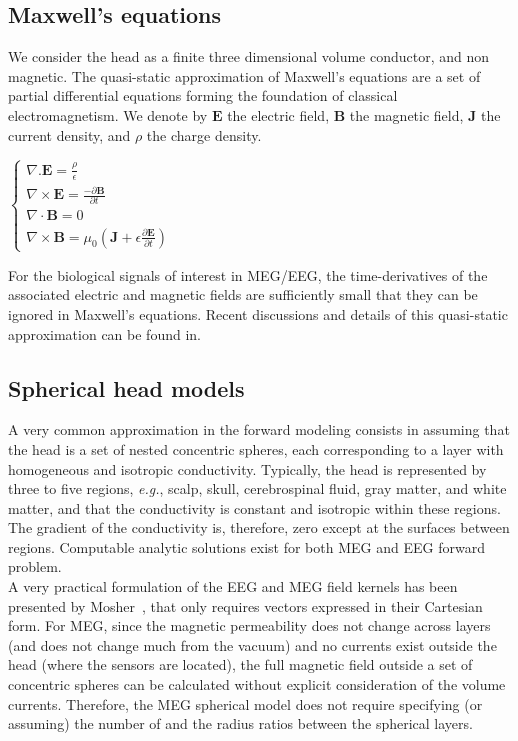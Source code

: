 \subsection*{Maxwell's equations}
We consider the head as a finite three dimensional volume conductor, and non magnetic. The quasi-static approximation of Maxwell's equations are a set of partial differential equations forming the foundation of classical electromagnetism. We denote by $\mathbf{E}$ the electric field, $\mathbf{B}$ the magnetic field, $\mathbf{J}$ the current density, and $\rho$ the charge density.

\begin{center}
$\left\{
\begin{array}{l}
  \nabla . \mathbf{E} = \frac{\rho}{\epsilon} \\
  \nabla \times \mathbf{E} = \frac{-\partial \mathbf{B}}{\partial t} \\
  \nabla \cdot \mathbf{B} = 0 \\
  \nabla \times \mathbf{B} = \mu_0 (\mathbf{J} + \epsilon\frac{\partial \mathbf{E}}{\partial t})
\end{array}
\right.$
\end{center}

For the biological signals of interest in MEG/EEG, the time-derivatives of the associated electric and magnetic fields are sufficiently small that they can be ignored in Maxwell’s equations. Recent discussions and details of this quasi-static approximation can be found in\cite{hamalainen1993magnetoencephalography,tripp1983physical,heller1992brain}.\\

\subsection*{Spherical head models}
A very common approximation in the forward modeling consists in assuming that the head is a set of nested concentric spheres, each corresponding to a layer with homogeneous and isotropic conductivity. Typically, the head is represented by three to five regions, \textit{e.g.}, scalp, skull, cerebrospinal fluid, gray matter, and white matter, and that the conductivity is constant and isotropic within these regions. The gradient of the conductivity is, therefore, zero except at the surfaces between regions. Computable analytic solutions exist for both MEG and EEG forward problem.\\

A very practical formulation of the EEG and MEG field kernels has been presented by Mosher~\cite{mosher1999eeg}, that only requires vectors expressed in their Cartesian form. For MEG, since the magnetic permeability does not change across layers (and does not change much from the vacuum) and no currents exist outside the head (where the sensors are located), the full magnetic field outside a set of concentric spheres can be calculated without explicit consideration of the volume currents. Therefore, the MEG spherical model does not require specifying (or assuming) the number of and the radius ratios between the spherical layers.\\


